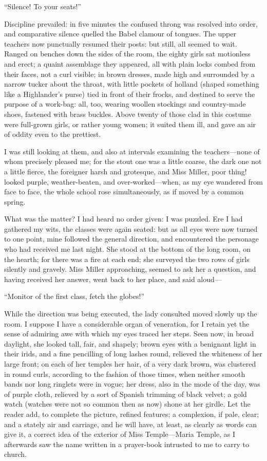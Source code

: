 \enquote{Silence! To your seats!}

Discipline prevailed: in five minutes the confused throng was resolved
into order, and comparative silence quelled the Babel clamour of
tongues. The upper teachers now punctually resumed their posts: but
still, all seemed to wait. Ranged on benches down the sides of the
room, the eighty girls sat motionless and erect; a quaint assemblage
they appeared, all with plain locks combed from their faces, not a curl
visible; in brown dresses, made high and surrounded by a narrow tucker
about the throat, with little pockets of holland (shaped something like
a Highlander's purse) tied in front of their frocks, and destined to
serve the purpose of a work-bag: all, too, wearing woollen stockings and
country-made shoes, fastened with brass buckles. Above twenty of those
clad in this costume were full-grown girls, or rather young women; it
suited them ill, and gave an air of oddity even to the prettiest.

I was still looking at them, and also at intervals examining the
teachers---none of whom precisely pleased me; for the stout one was a
little coarse, the dark one not a little fierce, the foreigner harsh and
grotesque, and Miss Miller, poor thing! looked purple, weather-beaten,
and over-worked---when, as my eye wandered from face to face, the whole
school rose simultaneously, as if moved by a common spring.

What was the matter? I had heard no order given: I was puzzled. Ere I
had gathered my wits, the classes were again seated: but as all eyes
were now turned to one point, mine followed the general direction, and
encountered the personage who had received me last night. She stood at
the bottom of the long room, on the hearth; for there was a fire at each
end; she surveyed the two rows of girls silently and gravely. Miss
Miller approaching, seemed to ask her a question, and having received
her answer, went back to her place, and said aloud---

\enquote{Monitor of the first class, fetch the globes!}

While the direction was being executed, the lady consulted moved slowly
up the room. I suppose I have a considerable organ of veneration, for I
retain yet the sense of admiring awe with which my eyes traced her
steps. Seen now, in broad daylight, she looked tall, fair, and shapely;
brown eyes with a benignant light in their irids, and a fine pencilling
of long lashes round, relieved the whiteness of her large front; on each
of her temples her hair, of a very dark brown, was clustered in round
curls, according to the fashion of those times, when neither smooth
bands nor long ringlets were in vogue; her dress, also in the mode of
the day, was of purple cloth, relieved by a sort of Spanish trimming of
black velvet; a gold watch (watches were not so common then as now)
shone at her girdle. Let the reader add, to complete the picture,
refined features; a complexion, if pale, clear; and a stately air and
carriage, and he will have, at least, as clearly as words can give it, a
correct idea of the exterior of Miss Temple---Maria Temple, as I
afterwards saw the name written in a prayer-book intrusted to me to
carry to church.

